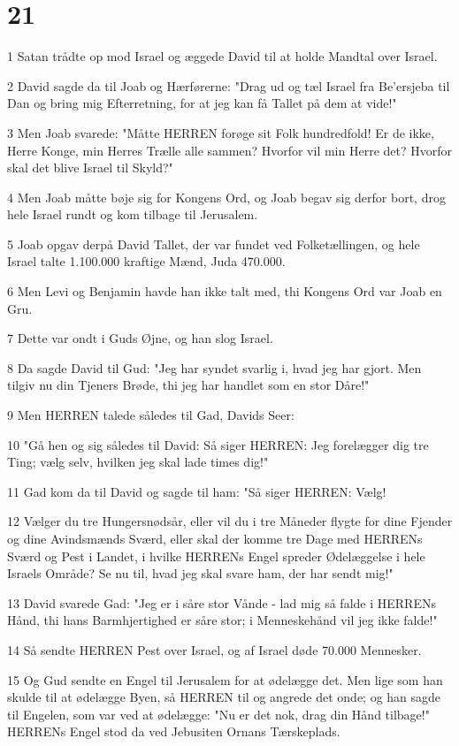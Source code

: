 \chapter{21}

\par 1 Satan trådte op mod Israel og æggede David til at holde Mandtal over Israel.
\par 2 David sagde da til Joab og Hærførerne: "Drag ud og tæl Israel fra Be'ersjeba til Dan og bring mig Efterretning, for at jeg kan få Tallet på dem at vide!"
\par 3 Men Joab svarede: "Måtte HERREN forøge sit Folk hundredfold! Er de ikke, Herre Konge, min Herres Trælle alle sammen? Hvorfor vil min Herre det? Hvorfor skal det blive Israel til Skyld?"
\par 4 Men Joab måtte bøje sig for Kongens Ord, og Joab begav sig derfor bort, drog hele Israel rundt og kom tilbage til Jerusalem.
\par 5 Joab opgav derpå David Tallet, der var fundet ved Folketællingen, og hele Israel talte 1.100.000 kraftige Mænd, Juda 470.000.
\par 6 Men Levi og Benjamin havde han ikke talt med, thi Kongens Ord var Joab en Gru.
\par 7 Dette var ondt i Guds Øjne, og han slog Israel.
\par 8 Da sagde David til Gud: "Jeg har syndet svarlig i, hvad jeg har gjort. Men tilgiv nu din Tjeners Brøde, thi jeg har handlet som en stor Dåre!"
\par 9 Men HERREN talede således til Gad, Davids Seer:
\par 10 "Gå hen og sig således til David: Så siger HERREN: Jeg forelægger dig tre Ting; vælg selv, hvilken jeg skal lade times dig!"
\par 11 Gad kom da til David og sagde til ham: "Så siger HERREN: Vælg!
\par 12 Vælger du tre Hungersnødsår, eller vil du i tre Måneder flygte for dine Fjender og dine Avindsmænds Sværd, eller skal der komme tre Dage med HERRENs Sværd og Pest i Landet, i hvilke HERRENs Engel spreder Ødelæggelse i hele Israels Område? Se nu til, hvad jeg skal svare ham, der har sendt mig!"
\par 13 David svarede Gad: "Jeg er i såre stor Vånde - lad mig så falde i HERRENs Hånd, thi hans Barmhjertighed er såre stor; i Menneskehånd vil jeg ikke falde!"
\par 14 Så sendte HERREN Pest over Israel, og af Israel døde 70.000 Mennesker.
\par 15 Og Gud sendte en Engel til Jerusalem for at ødelægge det. Men lige som han skulde til at ødelægge Byen, så HERREN til og angrede det onde; og han sagde til Engelen, som var ved at ødelægge: "Nu er det nok, drag din Hånd tilbage!" HERRENs Engel stod da ved Jebusiten Ornans Tærskeplads.
